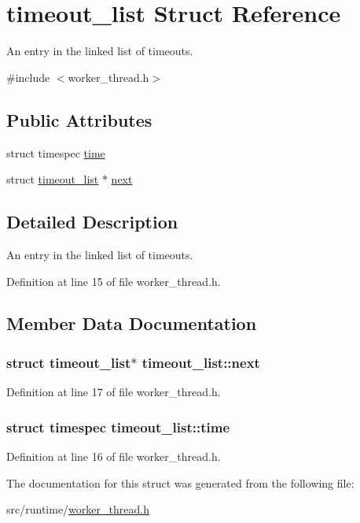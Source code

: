\hypertarget{structtimeout__list}{\section{timeout\-\_\-list Struct Reference}
\label{structtimeout__list}
}


An entry in the linked list of timeouts.  




{\ttfamily \#include $<$worker\-\_\-thread.\-h$>$}

\subsection*{Public Attributes}
\begin{DoxyCompactItemize}
\item 
struct timespec \hyperlink{structtimeout__list_af09ead12f05ea610fcf1442b61836b57}{time}
\item 
struct \hyperlink{structtimeout__list}{timeout\-\_\-list} $\ast$ \hyperlink{structtimeout__list_a6bfc03f73122960eb58e97453eeb26c8}{next}
\end{DoxyCompactItemize}


\subsection{Detailed Description}
An entry in the linked list of timeouts. 

Definition at line 15 of file worker\-\_\-thread.\-h.



\subsection{Member Data Documentation}
\hypertarget{structtimeout__list_a6bfc03f73122960eb58e97453eeb26c8}{
\subsubsection[{next}]{\setlength{\rightskip}{0pt plus 5cm}struct {\bf timeout\-\_\-list}$\ast$ timeout\-\_\-list\-::next}}\label{structtimeout__list_a6bfc03f73122960eb58e97453eeb26c8}


Definition at line 17 of file worker\-\_\-thread.\-h.

\hypertarget{structtimeout__list_af09ead12f05ea610fcf1442b61836b57}{
\subsubsection[{time}]{\setlength{\rightskip}{0pt plus 5cm}struct timespec timeout\-\_\-list\-::time}}\label{structtimeout__list_af09ead12f05ea610fcf1442b61836b57}


Definition at line 16 of file worker\-\_\-thread.\-h.



The documentation for this struct was generated from the following file\-:\begin{DoxyCompactItemize}
\item 
src/runtime/\hyperlink{worker__thread_8h}{worker\-\_\-thread.\-h}\end{DoxyCompactItemize}
